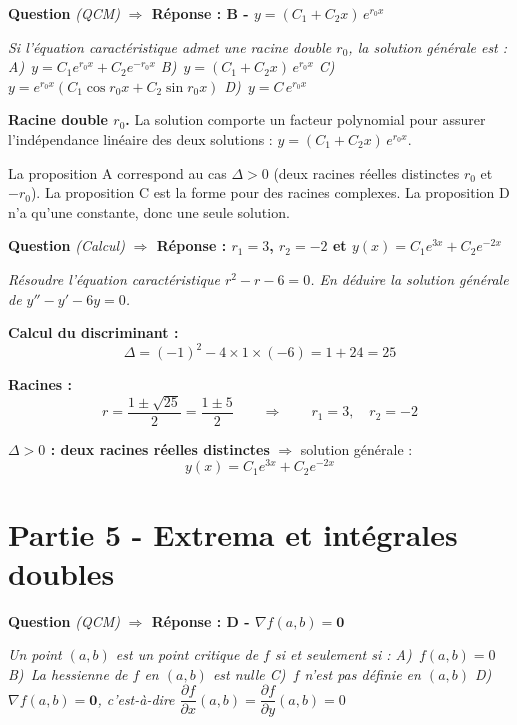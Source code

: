 \documentclass[11pt,a4paper]{article}
\newcounter{qnum}
\newcommand{\qtitre}[2]{%
  \stepcounter{qnum}%
  \medskip\noindent
  \textbf{\color{bleutexte}Question \theqnum}\enspace
  \textit{(#1)}\enspace
  \textcolor{vertok}{\textbf{$\Rightarrow$ Réponse : #2}}
  \par\smallskip
}
\newcommand{\qenonce}[1]{%
  \begin{mdframed}[backgroundcolor=grisbox, linewidth=0pt,
    innerleftmargin=8pt, innerrightmargin=8pt,
    innertopmargin=5pt, innerbottommargin=5pt,
    skipabove=2pt, skipbelow=4pt]
  \small\textit{#1}
  \end{mdframed}
}
\begin{document}
\qtitre{QCM}{B - $y = (C_1 + C_2 x)\,e^{r_0 x}$}
\qenonce{Si l'équation caractéristique admet une racine double $r_0$, la solution générale est :
\quad A)~$y = C_1 e^{r_0 x} + C_2 e^{-r_0 x}$
\quad B)~$y = (C_1 + C_2 x)\,e^{r_0 x}$
\quad C)~$y = e^{r_0 x}(C_1\cos r_0 x + C_2\sin r_0 x)$
\quad D)~$y = C\,e^{r_0 x}$}

\begin{methodebox}
\textbf{Racine double $r_0$.} La solution comporte un facteur polynomial pour assurer l'indépendance linéaire des deux solutions : $y = (C_1 + C_2 x)\,e^{r_0 x}$.

La proposition A correspond au cas $\Delta > 0$ (deux racines réelles distinctes $r_0$ et $-r_0$). La proposition C est la forme pour des racines complexes. La proposition D n'a qu'une constante, donc une seule solution.
\end{methodebox}

\qtitre{Calcul}{$r_1 = 3$, $r_2 = -2$ \quad et \quad $y(x) = C_1 e^{3x} + C_2 e^{-2x}$}
\qenonce{Résoudre l'équation caractéristique $r^2 - r - 6 = 0$. En déduire la solution générale de $y'' - y' - 6y = 0$.}

\begin{reponsebox}
\textbf{Calcul du discriminant :}
$$\Delta = (-1)^2 - 4\times 1\times(-6) = 1 + 24 = 25$$

\textbf{Racines :}
$$r = \frac{1 \pm \sqrt{25}}{2} = \frac{1 \pm 5}{2} \qquad \Rightarrow \qquad r_1 = 3, \quad r_2 = -2$$

\textbf{$\Delta > 0$ : deux racines réelles distinctes} $\Rightarrow$ solution générale :
$$\boxed{y(x) = C_1 e^{3x} + C_2 e^{-2x}}$$
\end{reponsebox}

\section{Partie 5 - Extrema et intégrales doubles}

\qtitre{QCM}{D - $\nabla f(a,b) = \mathbf{0}$}
\qenonce{Un point $(a,b)$ est un point critique de $f$ si et seulement si :
\quad A)~$f(a,b) = 0$
\quad B)~La hessienne de $f$ en $(a,b)$ est nulle
\quad C)~$f$ n'est pas définie en $(a,b)$
\quad D)~$\nabla f(a,b) = \mathbf{0}$, c'est-à-dire $\dfrac{\partial f}{\partial x}(a,b) = \dfrac{\partial f}{\partial y}(a,b) = 0$}
\end{document}

